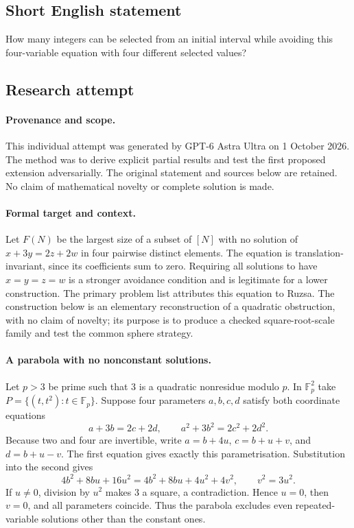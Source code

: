 \documentclass[11pt,a4paper]{article}
\newcommand{\F}{\mathbb{F}}
\begin{document}
\subsection{Short English statement}

How many integers can be selected from an initial interval while avoiding this four-variable equation with four different selected values?

\subsection{Research attempt}

\paragraph{Provenance and scope.}
This individual attempt was generated by GPT-6 Astra Ultra on 1 October 2026. The method was to derive explicit partial results and test the first proposed extension adversarially. The original statement and sources below are retained. No claim of mathematical novelty or complete solution is made.

\paragraph{Formal target and context.}
Let $F(N)$ be the largest size of a subset of $[N]$ with no solution of $x+3y=2z+2w$ in four pairwise distinct elements. The equation is translation-invariant, since its coefficients sum to zero. Requiring all solutions to have $x=y=z=w$ is a stronger avoidance condition and is legitimate for a lower construction. The primary problem list attributes this equation to Ruzsa. The construction below is an elementary reconstruction of a quadratic obstruction, with no claim of novelty; its purpose is to produce a checked square-root-scale family and test the common sphere strategy.

\paragraph{A parabola with no nonconstant solutions.}
Let $p>3$ be prime such that $3$ is a quadratic nonresidue modulo $p$. In $\F_p^2$ take $P=\{(t,t^2):t\in\F_p\}$. Suppose four parameters $a,b,c,d$ satisfy both coordinate equations
\[
 a+3b=2c+2d,\qquad a^2+3b^2=2c^2+2d^2.
\]
Because two and four are invertible, write $a=b+4u$, $c=b+u+v$, and $d=b+u-v$. The first equation gives exactly this parametrisation. Substitution into the second gives
\[
 4b^2+8bu+16u^2=4b^2+8bu+4u^2+4v^2,
 \qquad v^2=3u^2.
\]
If $u\ne0$, division by $u^2$ makes $3$ a square, a contradiction. Hence $u=0$, then $v=0$, and all parameters coincide. Thus the parabola excludes even repeated-variable solutions other than the constant ones.
\end{document}
